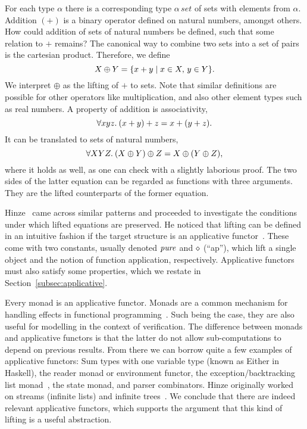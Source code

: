 \begin{example}\label{exmp:set-intro}
For each type $\alpha$ there is a corresponding type $\alpha\,\mathit{set}$
of sets with elements from $\alpha$.
Addition $(+)$ is a binary operator defined on natural numbers, amongst others.
How could addition of sets of natural numbers be defined, such that some
relation to $+$ remains?
The canonical way to combine two sets into a set of pairs is the cartesian
product.
Therefore, we define
\begin{equation}\label{eq:set-plus-exp}
	X \oplus Y = \{x + y\mid x \in X,\, y \in Y\}.
\end{equation}
We interpret $\oplus$ as the lifting of $+$ to sets.
Note that similar definitions are possible for other operators like
multiplication, and also other element types such as real numbers.
A property of addition is associativity,
\begin{equation}\label{eq:plus-assoc}
	\forall x y z.\>(x + y) + z = x + (y + z).
\end{equation}
It can be translated to sets of natural numbers,
\begin{equation}\label{eq:set-plus-assoc}
	\forall X Y Z.\>(X \oplus Y) \oplus Z = X \oplus (Y \oplus Z),
\end{equation}
where it holds as well, as one can check with a slightly laborious proof.
The two sides of the latter equation can be regarded as functions with three
arguments.
They are the lifted counterparts of the former equation.
\end{example}

Hinze~\cite{hinze10} came across similar patterns and proceeded to investigate
the conditions under which lifted equations are preserved.
He noticed that lifting can be defined in an intuitive fashion if the target
structure is an applicative functor~\cite{mcbride08}.
These come with two constants, usually denoted $\operatorname{\mathit{pure}}$ and $\diamond$ (``ap''),
which lift a single object and the notion of function application, respectively.
Applicative functors must also satisfy some properties, which we restate in
Section~\ref{subsec:applicative}.

Every monad is an applicative functor.
Monads are a common mechanism for handling effects in functional
programming~\cite{wadler95}.
Such being the case, they are also useful for modelling in the context of
verification.
The difference between monads and applicative functors is that the latter
do not allow sub-computations to depend on previous results.
From there we can borrow quite a few examples of applicative functors:
Sum types with one variable type (known as \textsf{Either} in Haskell),
the reader monad or environment functor, the exception/backtracking list
monad~\cite{wadler85}, the state monad, and parser combinators.
Hinze originally worked on streams (infinite lists) and infinite
trees~\cite{hinze08,hinze09}.
We conclude that there are indeed relevant applicative functors, which supports
the argument that this kind of lifting is a useful abstraction.

